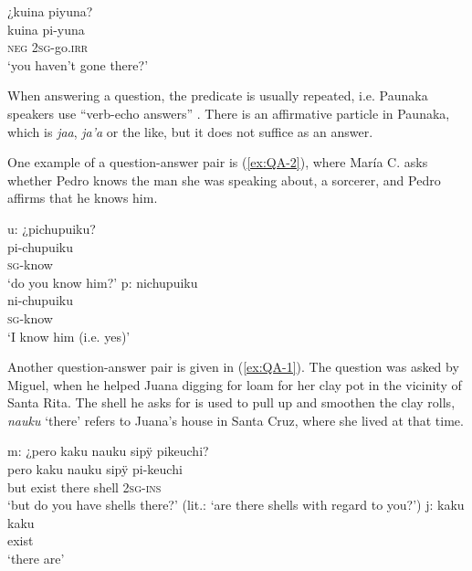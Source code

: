 \ea\label{ex:Q6}
\begingl
\glpreamble ¿kuina piyuna?\\
\gla kuina pi-yuna\\
\glb \textsc{neg} 2\textsc{sg}-go.\textsc{irr}\\
\glft ‘you haven’t gone there?’
\endgl
\trailingcitation{[jxx-p120430l-2.551]}
\xe

When answering a question, the predicate is usually repeated, i.e. Paunaka speakers use “verb-echo answers” \citep[3]{Holmberg2016}. There is an affirmative particle in Paunaka, which is \textit{jaa}, \textit{ja’a} or the like, but it does not suffice as an answer. 

One example of a question-answer pair is (\ref{ex:QA-2}), where María C. asks whether Pedro knows the man she was speaking about, a sorcerer, and Pedro affirms that he knows him.


\ea\label{ex:QA-2}
  \ea\label{ex:QA-2.1}
\begingl
\glpreamble \textup{u:} ¿pichupuiku?\\
\gla pi-chupuiku\\
\textsc{sg}-know\\
\glft ‘do you know him?’
\endgl
  \ex\label{ex:QA-2.2}
\begingl
\glpreamble \textup{p:} nichupuiku\\
\gla ni-chupuiku\\
\textsc{sg}-know\\
\glft ‘I know him (i.e. yes)’
\endgl
\trailingcitation{[ump-p110815sf.553-554]}
\z
\xe


Another question-answer pair is given in (\ref{ex:QA-1}). The question was asked by Miguel, when he helped Juana digging for loam for her clay pot in the vicinity of Santa Rita. The shell he asks for is used to pull up and smoothen the clay rolls, \textit{nauku} ‘there’ refers to Juana’s house in Santa Cruz, where she lived at that time.

\ea\label{ex:QA-1}
  \ea
\begingl
\glpreamble \textup{m:} ¿pero kaku nauku sipÿ pikeuchi?\\
\gla pero kaku nauku sipÿ pi-keuchi\\
\glb but exist there shell 2\textsc{sg}-\textsc{ins}\\
\glft ‘but do you have shells there?’ (lit.: ‘are there shells with regard to you?’)
\endgl
  \ex
\begingl
\glpreamble \textup{j:} kaku\\
\gla kaku\\
\glb exist\\
\glft ‘there are’
\endgl
\trailingcitation{[jmx-d110918ls-1.098-099]}
\z
\xe

